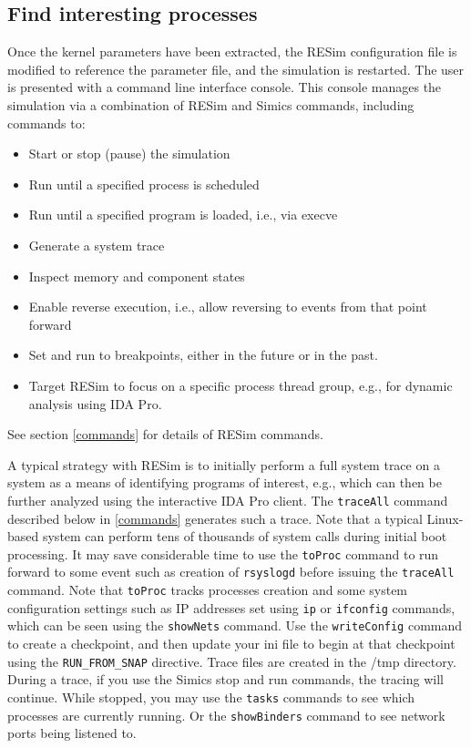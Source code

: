 \documentclass[titlepage]{article}
\begin{document}
\subsection{Find interesting processes}
Once the kernel parameters have been extracted, the RESim configuration file is modified to reference the parameter file, and the simulation is restarted. The user is
presented with a command line interface console.  This console manages the simulation via a combination of RESim and Simics commands, including commands to:
\begin{itemize}
\item Start or stop (pause) the simulation
\item Run until a specified process is scheduled
\item Run until a specified program is loaded, i.e., via execve
\item Generate a system trace
\item Inspect memory and component states
\item Enable reverse execution, i.e., allow reversing to events from that point forward
\item Set and run to breakpoints, either in the future or in the past.
\item Target RESim to focus on a specific process thread group, e.g., for dynamic analysis using IDA Pro.
\end{itemize}
\noindent See section \ref{commands} for details of RESim commands.

A typical strategy with RESim is to initially perform a full system trace on a system as a means of identifying programs of interest, e.g., which can then be
further analyzed using the interactive IDA Pro client.  The {\tt traceAll} command described below in \ref{commands} generates such a trace.  Note that a typical Linux-based
system can perform tens of thousands of system calls during initial boot processing.  It may save considerable time to use the {\tt toProc} command to run forward to some
event such as creation of {\tt rsyslogd} before issuing the {\tt traceAll} command.  Note that {\tt toProc} tracks processes creation and some system configuration settings such as
IP addresses set using {\tt ip} or {\tt ifconfig} commands, which can be seen using the {\tt showNets} command.  Use the {\tt writeConfig} command to create a checkpoint,
and then update your ini file to begin at that checkpoint using the {\tt RUN\_FROM\_SNAP} directive.  Trace files are created in the /tmp directory.  During a trace, if you use the Simics stop and
run commands, the tracing will continue.  While stopped, you may use the {\tt tasks} commands to see which processes are currently running.  Or the {\tt showBinders} command to 
see network ports being listened to. 
\end{document}
